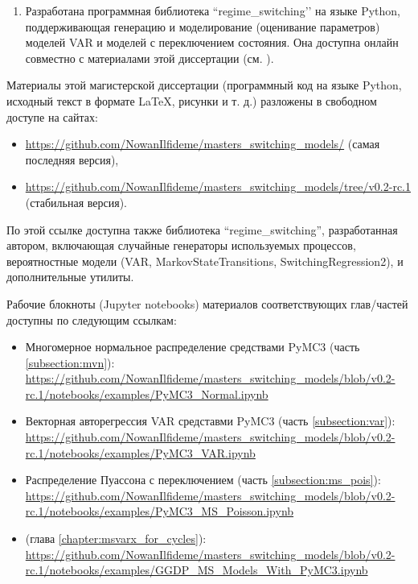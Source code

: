 \documentclass[a4paper,14pt]{extreport}
\newcommand{\coderepo}{https://github.com/NowanIlfideme/masters_switching_models}
\newcommand{\codeversion}{v0.2-rc.1}
\newcommand{\genurl}[1]{\url{\coderepo/#1}}
\begin{document}
\begin{enumerate}
\begin{enumerate}
		      \item Однако, существуют и некоторые недостатки: время работы алгоритмов семплирования MCMC значительно дольше даже классических итерационных, и проблема ``label switching’’ (перескок классов внутри цепи MCMC) для моделей с векторными параметрами всё еще является порогом стабильной работы и сходимости этих алгоритмов.
	      \end{enumerate}
	\item Разработана программная библиотека ``regime\_switching’’ на языке Python, поддерживающая генерацию и моделирование (оценивание параметров) моделей VAR и моделей с переключением состояния. Она доступна онлайн совместно с материалами этой диссертации (см. ).
\end{enumerate}





\printbibliography[title=Список использованных источников]


\appendix
{}

\label{appendix}

Материалы этой магистерской диссертации (программный код на языке Python, исходный текст в формате \LaTeX, рисунки и т. д.) разложены в свободном доступе на сайтах:

\begin{itemize}
	\item \genurl{} (самая последняя версия),
	\item \genurl{tree/\codeversion} (стабильная версия).
\end{itemize}

По этой ссылке доступна также библиотека ``regime\_switching'', разработанная автором, включающая случайные генераторы используемых процессов, вероятностные модели (VAR, MarkovStateTransitions, SwitchingRegression2), и дополнительные утилиты.

Рабочие блокноты (Jupyter notebooks) материалов соответствующих глав/частей доступны по следующим ссылкам:

\begin{itemize}
	\item Многомерное нормальное распределение средствами PyMC3 (часть \ref{subsection:mvn}): \genurl{blob/\codeversion/notebooks/examples/PyMC3_Normal.ipynb}
	\item Векторная авторегрессия VAR средставми PyMC3 (часть \ref{subsection:var}): \genurl{blob/\codeversion/notebooks/examples/PyMC3_VAR.ipynb}
	\item Распределение Пуассона с переключением (часть \ref{subsection:ms_pois}): \genurl{blob/\codeversion/notebooks/examples/PyMC3_MS_Poisson.ipynb}
	\item {} (глава \ref{chapter:msvarx_for_cycles}): \genurl{blob/\codeversion/notebooks/examples/GGDP_MS_Models_With_PyMC3.ipynb}
\end{itemize}
\end{document}
